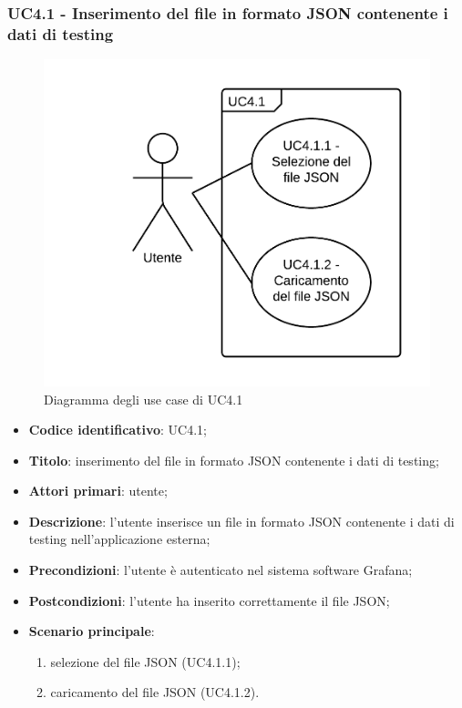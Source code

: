 \subsubsection{UC4.1 - Inserimento del file in formato JSON contenente i dati di testing}
\begin{figure}[H]
\includegraphics{img/UC4_1_-_Inserimento_del_file_in_formato_JSON_contenente_i_dati_di_testing.png}
\caption{Diagramma degli use case di UC4.1}
\end{figure}
\begin{itemize}
    \item \textbf{Codice identificativo}: UC4.1;
    \item \textbf{Titolo}: inserimento del file in formato JSON contenente i dati di testing;
    \item \textbf{Attori primari}: utente;
    \item \textbf{Descrizione}: l'utente inserisce un file in formato JSON contenente i dati di testing nell'applicazione esterna;
    \item \textbf{Precondizioni}: l'utente è autenticato nel sistema software Grafana\glo;
    \item \textbf{Postcondizioni}: l'utente ha inserito correttamente il file JSON;
    \item \textbf{Scenario principale}:
		\begin{enumerate}
			\item selezione del file JSON (UC4.1.1);
			\item caricamento del file JSON (UC4.1.2).
		\end{enumerate}
\end{itemize}

